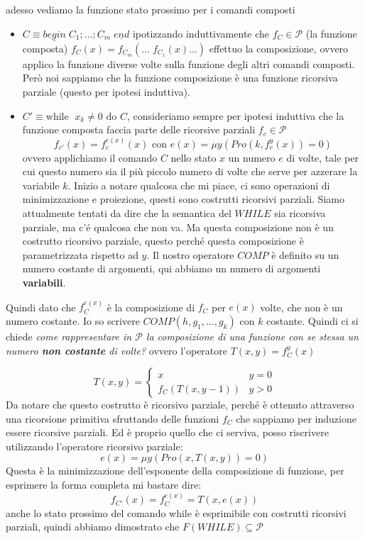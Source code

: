 \documentclass{article}
\begin{document}
adesso vediamo la funzione stato prossimo per i comandi composti
\begin{itemize}
    \item $C\equiv \underline{begin}\;C_1;\dots;C_m\;\underline{end}$
          ipotizzando induttivamente che $f_C\in\mathcal{P}$ (la funzione composta)
          $f_C(x)=f_{C_m}(\dots\;f_{C_1}(x)\dots)$
          effettuo la composizione, ovvero applico la funzione diverse volte sulla funzione degli
          altri comandi composti. Però noi sappiamo che la funzione composizione è una funzione
          ricorsiva parziale (questo per ipotesi induttiva).

    \item $C'\equiv\text{while }\;x_k\neq 0\text{ do }C$, consideriamo sempre per ipotesi
          induttiva che la funzione composta faccia parte delle ricorsive parziali $f_c\in\mathcal{P}$
          $$f_{c'}(x)=f_c^{e(x)}(x)\text{ con }e(x)=\mu y(Pro(k,f_c^y(x))=0)$$
          ovvero applichiamo il comando $C$ nello stato $x$ un numero $e$ di volte, tale per cui
          questo numero sia il più piccolo numero di volte che serve per azzerare la variabile $k$.
\newline\newline
          Inizio a notare qualcosa che mi piace, ci sono operazioni di minimizzazione e proiezione,
          questi sono costrutti ricorsivi parziali.
\newline\newline
          Siamo attualmente tentati da dire che la semantica del $WHILE$ sia ricorsiva parziale, ma
          c'é qualcosa che non va. Ma questa composizione non è un costrutto ricorsivo parziale, questo
          perché questa composizione è parametrizzata rispetto ad $y$. Il nostro operatore $COMP$ è definito
          su un numero costante di argomenti, qui abbiamo un numero di argomenti \textbf{variabili}.
\end{itemize}

Quindi dato che $f_C^{e(x)}$ è la composizione di $f_C$ per $e(x)$ volte, che non è un numero
costante. Io so scrivere $COMP(h,g_1,\dots,g_k)$ con $k$ costante. Quindi ci si chiede
\textit{come rappresentare in $\mathcal{P}$ la composizione di una funzione con se stessa
    un numero \textbf{non costante} di volte?} ovvero l'operatore $T(x,y)=f_C^y(x)$

\[
    T(x,y)=
    \begin{cases}
        x             & y=0 \\
        f_C(T(x,y-1)) & y>0
    \end{cases}
\]
Da notare che questo costrutto è ricorsivo parziale, perché è ottenuto attraverso una
ricorsione primitiva sfruttando delle funzioni $f_C$ che sappiamo per induzione essere ricorsive
parziali. Ed è proprio quello che ci serviva, posso riscrivere utilizzando l'operatore
ricorsivo parziale:
$$e(x)=\mu y(Pro(x,T(x,y))=0)$$
Questa è la minimizzazione dell'esponente della composizione di funzione, per esprimere
la forma completa mi bastare dire:
$$f_{C'}(x)=f_C^{e(x)}=T(x,e(x))$$
anche lo stato prossimo del comando while è esprimibile con costrutti ricorsivi parziali, quindi
abbiamo dimostrato che $F(WHILE)\subseteq\mathcal{P}$
\end{document}
